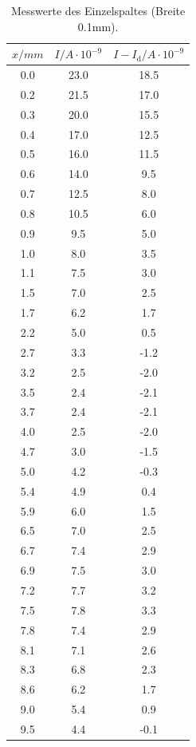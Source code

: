 \begin{table}
\label{tab:e1}
\centering
\caption{Messwerte des Einzelspaltes (Breite 0.1mm).}
\begin{minipage}{0.46\textwidth}
	\begin{tabular}{c|c|c}
		\toprule
		{$x / mm$} & {$I / A\cdot10^{-9}$} & {$I - I_\text{d} / A\cdot10^{-9}$}\\
		\hline
        \midrule
        0.0 & 23.0&18.5\\
        0.2 & 21.5&17.0\\
        0.3 & 20.0&15.5\\
        0.4 & 17.0&12.5\\
        0.5 & 16.0&11.5\\
        0.6 & 14.0&9.5\\
        0.7 & 12.5&8.0\\
        0.8 & 10.5&6.0\\
        0.9 & 9.5&5.0\\
        1.0 & 8.0&3.5\\
        1.1 & 7.5&3.0\\
        1.5 & 7.0&2.5\\
        1.7 & 6.2&1.7\\
        2.2 & 5.0&0.5\\
        2.7 & 3.3&-1.2\\
        3.2 & 2.5&-2.0\\
        3.5 & 2.4&-2.1\\
        3.7 & 2.4&-2.1\\
        4.0 & 2.5&-2.0\\
        4.7 & 3.0&-1.5\\
        5.0 & 4.2&-0.3\\
        5.4 & 4.9&0.4\\
        5.9 & 6.0&1.5\\
        6.5 & 7.0&2.5\\
        6.7 & 7.4&2.9\\
        6.9 & 7.5&3.0\\
        7.2 & 7.7&3.2\\
        7.5 & 7.8&3.3\\
        7.8 & 7.4&2.9\\
        8.1 & 7.1&2.6\\
        8.3 & 6.8&2.3\\
        8.6 & 6.2&1.7\\
        9.0 &5.4&0.9\\
        9.5 & 4.4&-0.1\\

\end{tabular}
\end{minipage}
\end{table}
